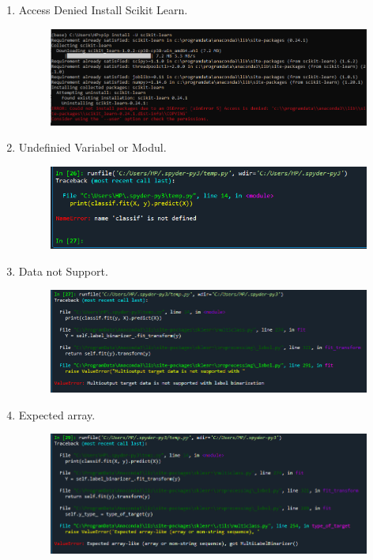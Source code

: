 \begin{enumerate}
\item Access Denied Install Scikit Learn.
\begin{figure}[!htbp]
	\centering
	\includegraphics[scale=0.6]{figures/8.png}
\end{figure}
\item Undefinied Variabel or Modul.
\begin{figure}[!htbp]
	\centering
	\includegraphics[scale=0.6]{figures/7.png}
\end{figure}
\newpage
\item Data not Support.
\begin{figure}[!htbp]
	\centering
	\includegraphics[scale=0.6]{figures/9.png}
\end{figure}
\item Expected array.
\begin{figure}[!htbp]
	\centering
	\includegraphics[scale=0.6]{figures/10.png}
\end{figure}


\end{enumerate}
